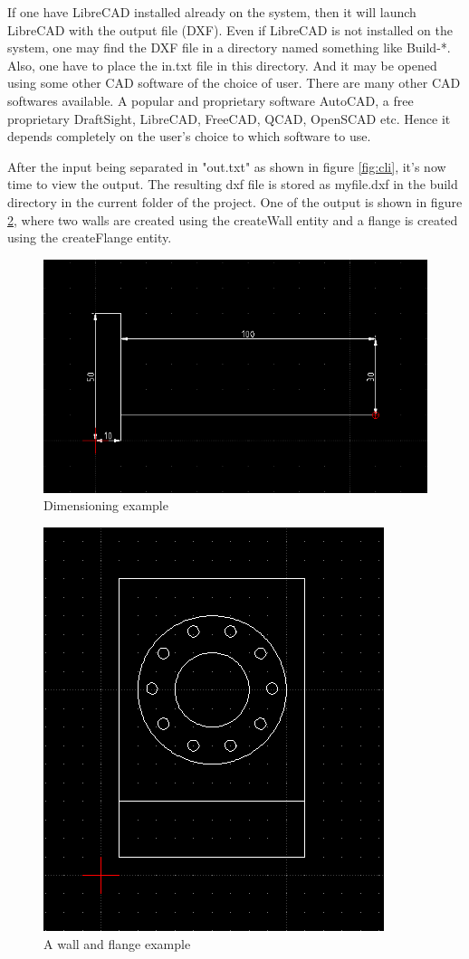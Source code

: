 If one have LibreCAD installed already on the system, then it will launch LibreCAD with the output file (DXF). Even if LibreCAD is not installed on the system, one may find the DXF file in a directory named something like Build-*. Also, one have to place the in.txt file in this directory. And it may be opened using some other CAD software of the choice of user. There are many other CAD softwares available. A popular and proprietary software AutoCAD, a free proprietary DraftSight, LibreCAD, FreeCAD, QCAD, OpenSCAD etc. Hence it depends completely on the user's choice to which software to use.

After the input being separated in "out.txt" as shown in figure \ref{fig:cli}, it's now time to view the output. The resulting dxf file is stored as myfile.dxf in the build directory in the current folder of the project. One of the output is shown in figure \ref{fig:flange}, where two walls are created using the createWall entity and a flange is created using the createFlange entity.

\begin{figure}
\centering
\includegraphics[scale=0.6]{images/dimensions.png}
\caption{Dimensioning example}
\label{fig:dim}
\end{figure}


\begin{figure}
\centering
\includegraphics[scale=0.7]{images/flange.png}
\caption{A wall and flange example}
\label{fig:flange}
\end{figure}